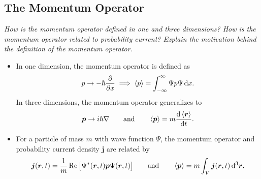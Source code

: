 \documentclass[11pt, a4paper]{article}
\newcommand{\diff}{\mathop{}\!\mathrm{d}} %
\newcommand{\dr}{\diff^{3} \r}  %
\renewcommand{\grad}{\nabla}
\newcommand{\eqtext}[1]{\qquad \text{#1} \qquad}
\renewcommand{\vec}[1]{\bm{#1}}  %
\renewcommand{\r}{\vec{r}}  %
\renewcommand{\P}{\Psi}  %
\begin{document}
\subsection{The Momentum Operator}
\textit{How is the momentum operator defined in one and three dimensions? How is the momentum operator related to probability current? Explain the motivation behind the definition of the momentum operator.}
\begin{itemize}
	\item In one dimension, the momentum operator is defined as
	\begin{equation*}
		p \to - \hbar \pdv{x} \implies \ev{p} = \int_{-\infty}^{\infty} \P p \P \diff x.
	\end{equation*}
	In three dimensions, the momentum operator generalizes to 
	\begin{equation*}
		\vec{p} \to i \hbar \grad \eqtext{and}  \ev{\vec{p}} = m \dv{\ev{\r}}{t}.
	\end{equation*}
	
    \item For a particle of mass $ m $ with wave function $ \Psi $, the momentum operator and probability current density $ \vec{j} $ are related by
	\begin{equation*}
		\vec{j}(\r, t) = \frac{1}{m}\Re \big[\P^{*}(\r, t) \vec{p} \P(\r, t)\big] \eqtext{and} \ev{\bm{p}}  = m \int_{V} \vec{j}(\r, t) \dr.
	\end{equation*}
\end{itemize}
\end{document}
